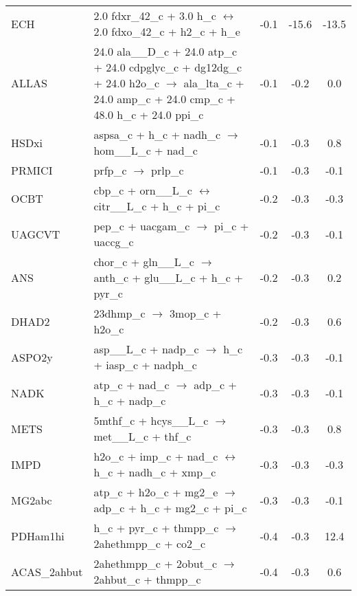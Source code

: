 \begin{supertabular}{lp{0.5\textwidth}ccc}
ECH	&	2.0 fdxr\_42\_c + 3.0 h\_c $\leftrightarrow$ 2.0 fdxo\_42\_c + h2\_c + h\_e	&	-0.1	&	-15.6	&	-13.5	\\
ALLAS	&	24.0 ala\_\_D\_c + 24.0 atp\_c + 24.0 cdpglyc\_c + dg12dg\_c + 24.0 h2o\_c $\rightarrow$ ala\_lta\_c + 24.0 amp\_c + 24.0 cmp\_c + 48.0 h\_c + 24.0 ppi\_c	&	-0.1	&	-0.2	&	0.0	\\
HSDxi	&	aspsa\_c + h\_c + nadh\_c $\rightarrow$ hom\_\_L\_c + nad\_c	&	-0.1	&	-0.3	&	0.8	\\
PRMICI	&	prfp\_c $\rightarrow$ prlp\_c	&	-0.1	&	-0.3	&	-0.1	\\
OCBT	&	cbp\_c + orn\_\_L\_c $\leftrightarrow$ citr\_\_L\_c + h\_c + pi\_c	&	-0.2	&	-0.3	&	-0.3	\\
UAGCVT	&	pep\_c + uacgam\_c $\rightarrow$ pi\_c + uaccg\_c	&	-0.2	&	-0.3	&	-0.1	\\
ANS	&	chor\_c + gln\_\_L\_c $\rightarrow$ anth\_c + glu\_\_L\_c + h\_c + pyr\_c	&	-0.2	&	-0.3	&	0.2	\\
DHAD2	&	23dhmp\_c $\rightarrow$ 3mop\_c + h2o\_c	&	-0.2	&	-0.3	&	0.6	\\
ASPO2y	&	asp\_\_L\_c + nadp\_c $\rightarrow$ h\_c + iasp\_c + nadph\_c	&	-0.3	&	-0.3	&	-0.1	\\
NADK	&	atp\_c + nad\_c $\rightarrow$ adp\_c + h\_c + nadp\_c	&	-0.3	&	-0.3	&	-0.1	\\
METS	&	5mthf\_c + hcys\_\_L\_c $\rightarrow$ met\_\_L\_c + thf\_c	&	-0.3	&	-0.3	&	0.8	\\
IMPD	&	h2o\_c + imp\_c + nad\_c $\leftrightarrow$ h\_c + nadh\_c + xmp\_c	&	-0.3	&	-0.3	&	-0.3	\\
MG2abc	&	atp\_c + h2o\_c + mg2\_e $\rightarrow$ adp\_c + h\_c + mg2\_c + pi\_c	&	-0.3	&	-0.3	&	-0.1	\\
PDHam1hi	&	h\_c + pyr\_c + thmpp\_c $\rightarrow$ 2ahethmpp\_c + co2\_c	&	-0.4	&	-0.3	&	12.4	\\
ACAS\_2ahbut	&	2ahethmpp\_c + 2obut\_c $\rightarrow$ 2ahbut\_c + thmpp\_c	&	-0.4	&	-0.3	&	0.6	\\

\end{supertabular}
